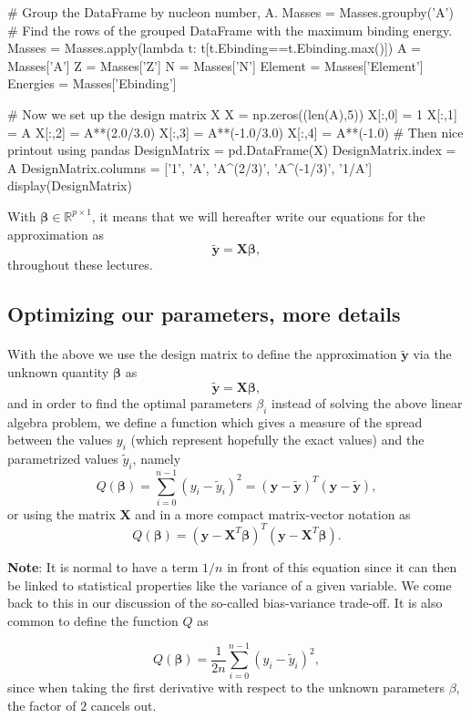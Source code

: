 \documentclass[%
oneside,                 %
final,                   %
10pt]{article}
\begin{document}
# Group the DataFrame by nucleon number, A.
Masses = Masses.groupby('A')
# Find the rows of the grouped DataFrame with the maximum binding energy.
Masses = Masses.apply(lambda t: t[t.Ebinding==t.Ebinding.max()])
A = Masses['A']
Z = Masses['Z']
N = Masses['N']
Element = Masses['Element']
Energies = Masses['Ebinding']

# Now we set up the design matrix X
X = np.zeros((len(A),5))
X[:,0] = 1
X[:,1] = A
X[:,2] = A**(2.0/3.0)
X[:,3] = A**(-1.0/3.0)
X[:,4] = A**(-1.0)
# Then nice printout using pandas
DesignMatrix = pd.DataFrame(X)
DesignMatrix.index = A
DesignMatrix.columns = ['1', 'A', 'A^(2/3)', 'A^(-1/3)', '1/A']
display(DesignMatrix)
\epycod

With $\bm{\beta}\in {\mathbb{R}}^{p\times 1}$, it means that we will hereafter write our equations for the approximation as
\[
\bm{\tilde{y}}= \bm{X}\bm{\beta},
\]
throughout these lectures. 


\subsection{Optimizing our parameters, more details}

\paragraph{}
With the above we use the design matrix to define the approximation $\bm{\tilde{y}}$ via the unknown quantity $\bm{\beta}$ as
\[
\bm{\tilde{y}}= \bm{X}\bm{\beta},
\]
and in order to find the optimal parameters $\beta_i$ instead of solving the above linear algebra problem, we define a function which gives a measure of the spread between the values $y_i$ (which represent hopefully the exact values) and the parametrized values $\tilde{y}_i$, namely
\[
Q(\bm{\beta})=\sum_{i=0}^{n-1}\left(y_i-\tilde{y}_i\right)^2=\left(\bm{y}-\bm{\tilde{y}}\right)^T\left(\bm{y}-\bm{\tilde{y}}\right),
\]
or using the matrix $\bm{X}$ and in a more compact matrix-vector notation as
\[
Q(\bm{\beta})=\left(\bm{y}-\bm{X}^T\bm{\beta}\right)^T\left(\bm{y}-\bm{X}^T\bm{\beta}\right).
\]

\textbf{Note}: It is normal to have a term $1/n$ in front of this equation
since it can then be linked to statistical properties like the
variance of a given variable. We come back to this in our discussion
of the so-called bias-variance trade-off.  It is also common to define
the function $Q$ as

\[
Q(\bm{\beta})=\frac{1}{2n}\sum_{i=0}^{n-1}\left(y_i-\tilde{y}_i\right)^2,
\]
since when taking the first derivative with respect to the unknown parameters $\beta$, the factor of $2$ cancels out.
\end{document}
